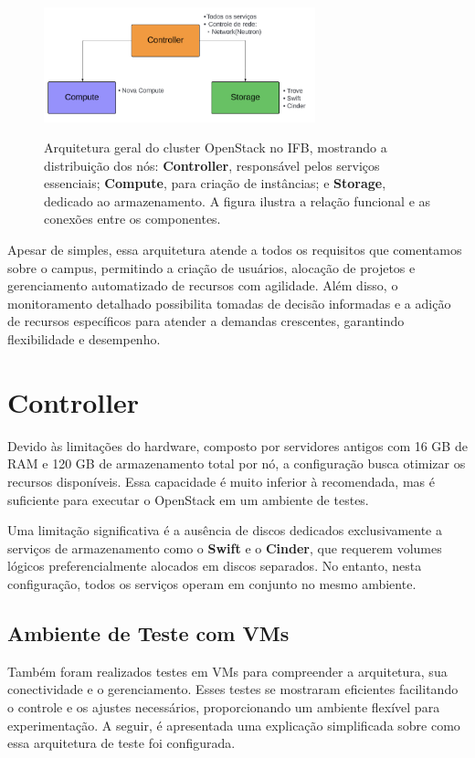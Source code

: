 \begin{figure}[htbp]
    \centering
    \caption{Arquitetura geral do cluster OpenStack no IFB, mostrando a distribuição dos nós: \textbf{Controller}, responsável pelos serviços essenciais; \textbf{Compute}, para criação de instâncias; e \textbf{Storage}, dedicado ao armazenamento. A figura ilustra a relação funcional e as conexões entre os componentes.}
    \includegraphics[width=0.7\textwidth]{images/cluster_architecture.png}
    \label{fig:cluster_architecture}
\end{figure}

Apesar de simples, essa arquitetura atende a todos os requisitos que comentamos sobre o campus, permitindo a criação de usuários, alocação de projetos e gerenciamento automatizado de recursos com agilidade. Além disso, o monitoramento detalhado possibilita tomadas de decisão informadas e a adição de recursos específicos para atender a demandas crescentes, garantindo flexibilidade e desempenho.

\section{Controller}

Devido às limitações do hardware, composto por servidores antigos com 16 GB de RAM e 120 GB de armazenamento total por nó, a configuração busca otimizar os recursos disponíveis. Essa capacidade é muito inferior à recomendada, mas é suficiente para executar o OpenStack em um ambiente de testes.

Uma limitação significativa é a ausência de discos dedicados exclusivamente a serviços de armazenamento como o \textbf{Swift} e o \textbf{Cinder}, que requerem volumes lógicos preferencialmente alocados em discos separados. No entanto, nesta configuração, todos os serviços operam em conjunto no mesmo ambiente.

\subsection{Ambiente de Teste com VMs}
Também foram realizados testes em VMs para compreender a arquitetura, sua conectividade e o gerenciamento. Esses testes se mostraram eficientes facilitando o controle e os ajustes necessários, proporcionando um ambiente flexível para experimentação. A seguir, é apresentada uma explicação simplificada sobre como essa arquitetura de teste foi configurada.

